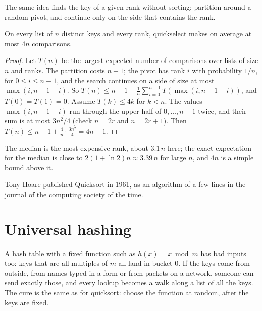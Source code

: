 The same idea finds the key of a given rank without sorting: partition around a random pivot, and continue only on the
side that contains the rank.

\label{lst:b2:randomised-algorithms:quickselect}

\begin{theorem}[Quickselect]\label{thm:b2:randomised-algorithms:quickselect}
On every list of $n$ distinct keys and every rank, quickselect makes on average at most $4n$ comparisons.
\end{theorem}

\begin{proof}
Let $T(n)$ be the largest expected number of comparisons over lists of size $n$ and ranks. The partition costs $n - 1$;
the pivot has rank $i$ with probability $1/n$, for $0 \leq i \leq n - 1$, and the search continues on a side of size at
most $\max(i, n - 1 - i)$. So $T(n) \leq n - 1 + \frac{1}{n} \sum_{i = 0}^{n - 1} T(\max(i, n - 1 - i))$, and $T(0) =
T(1) = 0$. Assume $T(k) \leq 4k$ for $k < n$. The values $\max(i, n - 1 - i)$ run through the upper half of $0, \dots, n
- 1$ twice, and their sum is at most $3n^2/4$ (check $n = 2r$ and $n = 2r + 1$). Then $T(n) \leq n - 1 + \frac{4}{n}
\cdot \frac{3n^2}{4} = 4n - 1$.
\end{proof}

\label{out:b2:randomised-algorithms:quickselect}

The median is the most expensive rank, about $3.1\,n$ here; the exact expectation for the median is close to
$2(1 + \ln 2) n \approx 3.39\, n$ for large $n$, and $4n$ is a simple bound above it.

\begin{history}
Tony Hoare published Quicksort in 1961, as an algorithm of a few lines in the journal of the computing society of the
time.
\end{history}

\section{Universal hashing}\label{sec:b2:randomised-algorithms:universal}

A hash table with a fixed function such as $h(x) = x \bmod m$ has bad inputs too: keys that are all multiples of $m$ all
land in bucket $0$. If the keys come from outside, from names typed in a form or from packets on a network, someone can
send exactly those, and every lookup becomes a walk along a list of all the keys. The cure is the same as for quicksort:
choose the function at random, after the keys are fixed.

